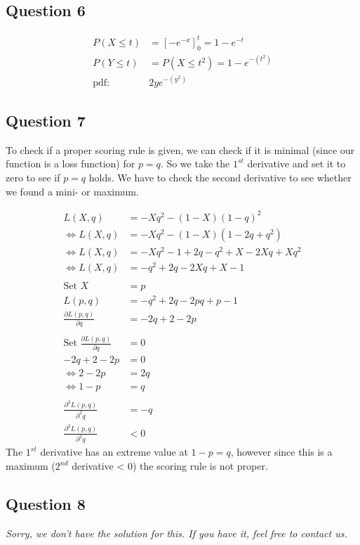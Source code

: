 \documentclass[../main/Notes.tex]{subfiles}
\begin{document}
\subsection*{Question 6}
\begin{align*}
P(X\leq t) &= \left[-e^{-x}\right]_0^t=1-e^{-t} \\
P(Y\leq t) &= P(X\leq t^2)=1-e^{-\left(t^2\right)} \\
\text{pdf: }&2ye^{-\left(y^2\right)}
\end{align*}



\subsection*{Question 7}
To check if a proper scoring rule is given, we can check if it is minimal (since our function is a loss function) for $p=q$. So we take the $1^{st}$ derivative and set it to zero to see if $p=q$ holds. We have to check the second derivative to see whether we found a mini- or maximum.

\begin{align*}
                L(X,q) &= -Xq^2-(1-X)(1-q)^2 \\
\Leftrightarrow L(X,q) &= -Xq^2-(1-X)(1-2q+q^2) \\
\Leftrightarrow L(X,q) &= -Xq^2-1+2q-q^2+X-2Xq+Xq^2 \\
\Leftrightarrow L(X,q) &= -q^2+2q-2Xq+X-1 \\
\\
\text{Set }X&=p \\
L(p,q) &= -q^2+2q-2pq+p-1 \\
\frac{\partial L(p,q)}{\partial q} &= -2q+2-2p \\
\\
\text{Set }\frac{\partial L(p,q)}{\partial q}&=0 \\
-2q+2-2p &= 0\\
\Leftrightarrow 2-2p&=2q \\
\Leftrightarrow 1-p&=q \\
\\
\frac{\partial^2 L(p,q)}{\partial^2 q} &= -q \\
\frac{\partial^2 L(p,q)}{\partial^2 q} &< 0
\end{align*}
The $1^{st}$ derivative has an extreme value at $1-p=q$, however since this is a maximum ($2^{nd}$ derivative < 0) the scoring rule is not proper.



\subsection*{Question 8}
\emph{Sorry, we don't have the solution for this. If you have it, feel free to contact us.}
\end{document}

